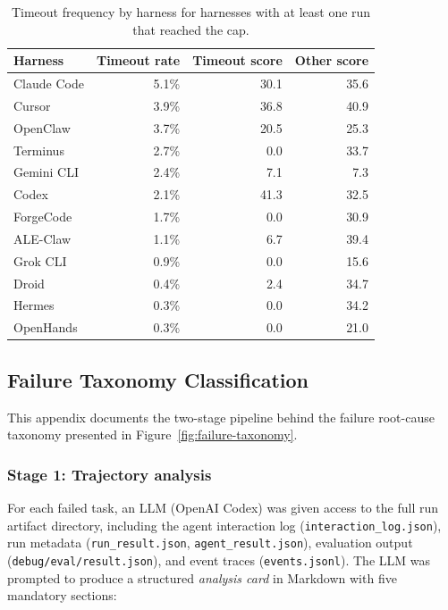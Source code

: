 \documentclass{llmxive}
\begin{document}
\begin{table}[!htbp]
\centering
\begin{tabular}{lrrr}
\toprule
Harness & Timeout rate & Timeout score & Other score \\
\midrule
Claude Code & 5.1\% & 30.1 & 35.6 \\
Cursor & 3.9\% & 36.8 & 40.9 \\
OpenClaw & 3.7\% & 20.5 & 25.3 \\
Terminus & 2.7\% & 0.0 & 33.7 \\
Gemini CLI & 2.4\% & 7.1 & 7.3 \\
Codex & 2.1\% & 41.3 & 32.5 \\
ForgeCode & 1.7\% & 0.0 & 30.9 \\
ALE-Claw & 1.1\% & 6.7 & 39.4 \\
Grok CLI & 0.9\% & 0.0 & 15.6 \\
Droid & 0.4\% & 2.4 & 34.7 \\
Hermes & 0.3\% & 0.0 & 34.2 \\
OpenHands & 0.3\% & 0.0 & 21.0 \\
\bottomrule
\end{tabular}
\caption{Timeout frequency by harness for harnesses with at least one run that reached the cap.}
\label{tab:timeout-by-harness}
\end{table}

\subsection{Failure Taxonomy Classification}
\label{app:failure-taxonomy}

This appendix documents the two-stage pipeline behind the failure root-cause taxonomy presented in Figure~\ref{fig:failure-taxonomy}.

\subsubsection{Stage 1: Trajectory analysis}
For each failed task, an LLM (OpenAI Codex) was given access to the full run artifact directory, including the agent interaction log (\texttt{interaction\_log.json}), run metadata (\texttt{run\_result.json}, \texttt{agent\_result.json}), evaluation output (\texttt{debug/eval/result.json}), and event traces (\texttt{events.jsonl}).
The LLM was prompted to produce a structured \emph{analysis card} in Markdown with five mandatory sections:
\end{document}
